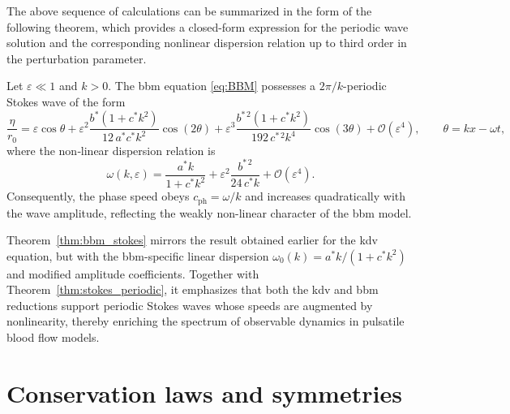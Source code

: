 \documentclass[alpha-refs, 12pt]{wiley-article}
\renewcommand{\O}{\mathcal{O}}
\newcommand{\eps}{\varepsilon}
\begin{document}
The above sequence of calculations can be summarized in the form of the following theorem, which provides a closed-form expression for the periodic wave solution and the corresponding nonlinear dispersion relation up to third order in the perturbation parameter.
\begin{theorem}\label{thm:bbm_stokes}
Let $\eps\ll1$ and $k>0$. The \acrshort{bbm} equation \eqref{eq:BBM} possesses a $2\pi/k$-periodic Stokes wave of the form
\begin{equation}\label{eq:bbm_eta_series}
  \frac{\eta}{r_{0}}
  =\eps\cos\theta
   +\eps^{2}
      \frac{b^{\ast}(1+c^{\ast}k^{2})}{12\,a^{\ast}c^{\ast}k^{2}}
      \cos(2\theta)
   +\eps^{3}
      \frac{b^{\ast\,2}(1+c^{\ast}k^{2})}{192\,c^{\ast\,2}k^{4}}
      \cos(3\theta)
   +\O(\eps^{4}), \qquad \theta=kx-\omega t,
  \end{equation}
where the non‐linear dispersion relation is
\begin{equation}\label{eq:bbm_dispersion}
  \omega(k,\eps)
  =\frac{a^{\ast}k}{1+c^{\ast}k^{2}}
   +\eps^{2}\frac{b^{\ast\,2}}{24\,c^{\ast}k}
   +\O(\eps^{4}).
\end{equation}
Consequently, the phase speed obeys
\(
  c_{\mathrm{ph}}=\omega/k
\)
and increases quadratically with the wave amplitude, reflecting the weakly non-linear character of the \acrshort{bbm} model.
\end{theorem}

Theorem~\ref{thm:bbm_stokes} mirrors the result obtained earlier for the \acrshort{kdv} equation, but with the \acrshort{bbm}-specific linear dispersion
\(
  \omega_{0}(k)=a^{\ast}k/(1+c^{\ast}k^{2})
\)
and modified amplitude coefficients. Together with Theorem~\ref{thm:stokes_periodic}, it emphasizes that both the \acrshort{kdv} and \acrshort{bbm} reductions support periodic Stokes waves whose speeds are augmented by nonlinearity, thereby enriching the spectrum of observable dynamics in pulsatile blood flow models.

\section{Conservation laws and symmetries}
\label{sec:cons_sym}
\end{document}

